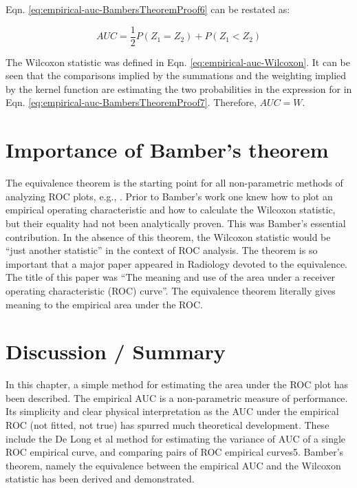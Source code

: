 \documentclass[
]{book}
\begin{document}
Eqn. \eqref{eq:empirical-auc-BambersTheoremProof6} can be restated as:

\begin{equation}
AUC=\frac{1}{2}P\left ( Z_1 = Z_2 \right ) + P\left ( Z_1 < Z_2 \right )
\label{eq:empirical-auc-BambersTheoremProof7}
\end{equation}

The Wilcoxon statistic was defined in Eqn. \eqref{eq:empirical-auc-Wilcoxon}. It can be seen that the comparisons implied by the summations and the weighting implied by the kernel function are estimating the two probabilities in the expression for in Eqn. \eqref{eq:empirical-auc-BambersTheoremProof7}. Therefore, \(AUC = W\).

\hypertarget{empirical-auc-wilcoxon-bamber-theorem-importance}{%
\section{Importance of Bamber's theorem}\label{empirical-auc-wilcoxon-bamber-theorem-importance}}

The equivalence theorem is the starting point for all non-parametric methods of analyzing ROC plots, e.g., \citep{RN2268, RN112}. Prior to Bamber's work one knew how to plot an empirical operating characteristic and how to calculate the Wilcoxon statistic, but their equality had not been analytically proven. This was Bamber's essential contribution. In the absence of this theorem, the Wilcoxon statistic would be ``just another statistic'' in the context of ROC analysis. The theorem is so important that a major paper appeared in Radiology \citep{RN1970} devoted to the equivalence. The title of this paper was ``The meaning and use of the area under a receiver operating characteristic (ROC) curve''. The equivalence theorem literally gives meaning to the empirical area under the ROC.

\hypertarget{empirical-auc-discussion-summary}{%
\section{Discussion / Summary}\label{empirical-auc-discussion-summary}}

In this chapter, a simple method for estimating the area under the ROC plot has been described. The empirical AUC is a non-parametric measure of performance. Its simplicity and clear physical interpretation as the AUC under the empirical ROC (not fitted, not true) has spurred much theoretical development. These include the De Long et al method for estimating the variance of AUC of a single ROC empirical curve, and comparing pairs of ROC empirical curves5. Bamber's theorem, namely the equivalence between the empirical AUC and the Wilcoxon statistic has been derived and demonstrated.
\end{document}
